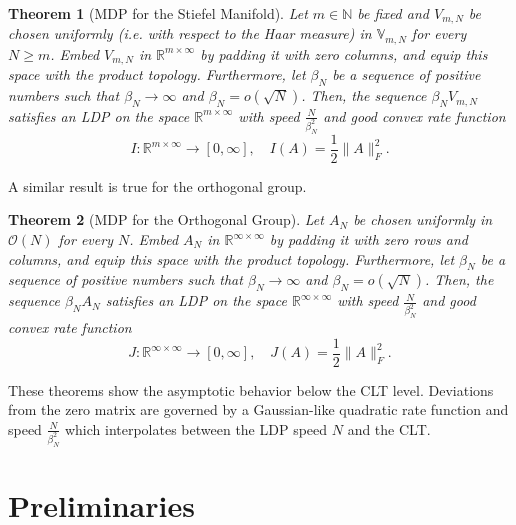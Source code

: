 \documentclass[11pt,a4paper,twoside]{article}
\newcommand{\R}{\mathbb R}
\newcommand{\N}{\mathbb N}
\renewcommand{\O}{\mathcal O}
\newtheorem{thmalpha}{Theorem}
\theoremstyle{definition}
\begin{document}
	\begin{thmalpha}[MDP for the Stiefel Manifold]\label{thm:MDPforStiefel_main} 
		Let $m\in\N$ be fixed and $V_{m,N}$ be chosen uniformly (i.e. with respect to the Haar measure) in $\mathbb{V}_{m,N}$ for every $N\ge m$. Embed $V_{m,N}$ in $\R^{m\times\infty}$ by padding it with zero columns, and equip this space with the product topology. Furthermore, let $\beta_N$ be a sequence of positive numbers such that $\beta_N\to\infty$ and $\beta_N = o(\sqrt{N})$. Then, the sequence $\beta_N V_{m,N}$ satisfies an LDP on the space $\R^{m\times\infty}$ with speed $\frac{N}{\beta_N^2}$ and good convex rate function 
		$$
		I:\R^{m\times\infty}\to [0,\infty],\quad I(A) = \frac{1}{2}\|A\|_F^2.
		$$ 
		\end{thmalpha}

		A similar result is true for the orthogonal group.
	
		\begin{thmalpha}[MDP for the Orthogonal Group]\label{thm:MDPorthogonalgroup} 
		Let $A_{N}$ be chosen uniformly in $\O(N)$ for every $N$. Embed $A_N$ in $\R^{\infty\times\infty}$ by padding it with zero rows and columns, and equip this space with the product topology. Furthermore, let $\beta_N$ be a sequence of positive numbers such that $\beta_N\to\infty$ and $\beta_N = o(\sqrt{N})$. Then, the sequence $\beta_N A_{N}$ satisfies an LDP on the space $\R^{\infty\times\infty}$ with speed $\frac{N}{\beta_N^2}$ and good convex rate function 
		$$
		J:\R^{\infty\times\infty}\to [0,\infty],\quad J(A) = \frac{1}{2}\|A\|_F^2.
		$$ 
		\end{thmalpha}
	
	\noindent These theorems show the asymptotic behavior below the CLT level.  Deviations from the zero matrix are governed by a Gaussian-like quadratic rate function and speed $\frac{N}{\beta_N^2}$ which interpolates between the LDP speed $N$ and the CLT.



\section{Preliminaries}\label{sec:preliminaries}\label{C:sec:preliminaries}
\end{document}
